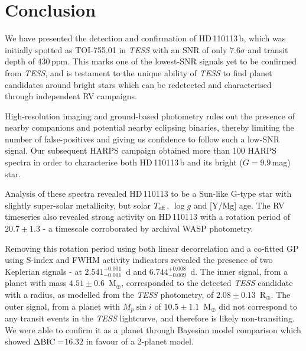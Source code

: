 \documentclass[fleqn,usenatbib]{mnras}
\newcommand{\tess}{{\it TESS}}
\newcommand{\harps}{{HARPS}}
\newcommand{\rearth}{R$_{\oplus}$}
\newcommand{\mearth}{M$_{\oplus}$}
\newcommand{\teff}{$T_{\rm eff}$}
\newcommand{\logg}{$\log g$}
\newcommand{\TPzero}{ $ 2.541^{+0.001}_{-0.001} $ }
\newcommand{\TPone}{ $ 6.744^{+0.008}_{-0.009} $ }
\newcommand{\TMpzero}{ $ 4.51 \pm 0.6 $ }
\newcommand{\TMpone}{ $ 10.5 \pm 1.1 $ }
\newcommand{\Trpl}{ $ 2.08 \pm 0.13 $ }
\newcommand{\Tperiod}{ $ 20.7 \pm 1.3 $ }
\newcommand{\TTplanet}{TOI-755.01}
\newcommand{\Tstar}{HD\,110113}
\newcommand{\Tplanet}{HD\,110113\,b}
\newcommand{\TdeltaBIC}{$16.32$}
\begin{document}

\section{Conclusion}
We have presented the detection and confirmation of \Tplanet{}, which was initially spotted as \TTplanet{} in \tess{} with an SNR of only $7.6\sigma$ and transit depth of 430\,ppm.
This marks one of the lowest-SNR signals yet to be confirmed from \tess{}, and is testament to the unique ability of \tess{} to find planet candidates around bright stars which can be redetected and characterised through independent RV campaigns.

High-resolution imaging and ground-based photometry rules out the presence of nearby companions and potential nearby eclipsing binaries, thereby limiting the number of false-positives and giving us confidence to follow such a low-SNR signal.
Our subsequent HARPS campaign obtained more than 100 \harps{} spectra in order to characterise both \Tplanet{} and its bright ($G=9.9$\,mag) star.

Analysis of these spectra revealed \Tstar{} to be a Sun-like G-type star with slightly super-solar metallicity, but solar \teff{}, \logg{} and [Y/Mg] age.
The RV timeseries also revealed strong activity on \Tstar{} with a rotation period of \Tperiod{} - a timescale corroborated by archival WASP photometry.

Removing this rotation period using both linear decorrelation and a co-fitted GP using S-index and FWHM activity indicators revealed the presence of two Keplerian signals - at \TPzero{}\,d and \TPone{}\,d.
The inner signal, from a planet with mass \TMpzero{}\,\mearth{}, corresponded to the detected \tess{} candidate with a radius, as modelled from the \tess{} photometry, of \Trpl{}\,\rearth{}.
The outer signal, from a planet with $M_p\sin{i}$ of \TMpone{}\,\mearth{} did not correspond to any transit events in the \tess{} lightcurve, and therefore is likely non-transiting.
We were able to confirm it as a planet through Bayesian model comparison which showed $\Delta{\rm BIC}= $\TdeltaBIC{} in favour of a 2-planet model.
\end{document}
